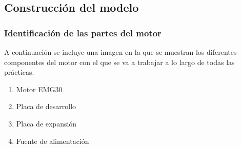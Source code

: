 \documentclass[a4paper, 12pt]{article}
\begin{document}
\subsection{Construcción del modelo}
\subsubsection{Identificación de las partes del motor}
A continuación se incluye una imagen en la que se muestran los diferentes componentes del motor con el que se va a trabajar a lo largo de todas las prácticas.

\begin{enumerate}
	\item Motor EMG30
	\item Placa de desarrollo
	\item Placa de expansión
	\item Fuente de alimentación
\end{enumerate}
\end{document}
